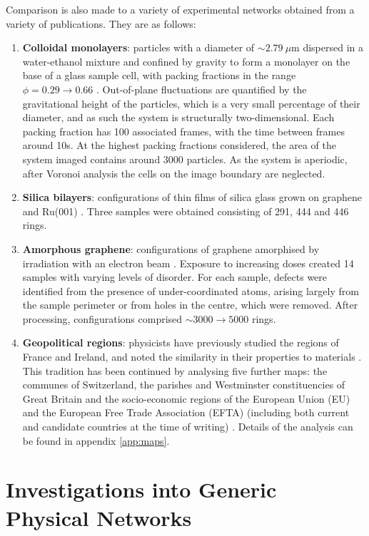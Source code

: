 Comparison is also made to a variety of experimental networks obtained from a variety of publications.
They are as follows:
\begin{enumerate}
	\item \textbf{Colloidal monolayers}: particles with a diameter of $\sim 2.79~\mu$m dispersed in a water\--ethanol mixture and confined by gravity to form a monolayer on the base of a glass sample cell, with packing fractions in the range $\phi=0.29\rightarrow 0.66$ \cite{Thorneywork2017}.
Out\--of\--plane fluctuations are quantified by the gravitational height of the particles, which is a very small percentage of their diameter, and as such the system is structurally two-dimensional.
Each packing fraction has 100 associated frames, with the time between frames around 10s.
At the highest packing fractions considered, the area of the system imaged contains around 3000 particles.
As the system is aperiodic, after Voronoi analysis the cells on the image boundary are neglected.
\item \textbf{Silica bilayers}: configurations of thin films of silica glass grown on graphene \cite{Huang2012} and Ru(001) \cite{Buchner2017}.
Three samples were obtained consisting of 291, 444 and 446 rings.
\item \textbf{Amorphous graphene}: configurations of graphene amorphised by irradiation with an electron beam \cite{Eder2014}.
Exposure to increasing doses created 14 samples with varying levels of disorder.
For each sample, defects were identified from the presence of under\--coordinated atoms, arising largely from the sample perimeter or from holes in the centre, which were removed.
After processing, configurations comprised $\sim3000\rightarrow5000$ rings.
\item \textbf{Geopolitical regions}: physicists have previously studied the regions of France and Ireland, and noted the similarity in their properties to materials \cite{LeCaer1993,Okabe1992}.
This tradition has been continued by analysing five further maps: the communes of Switzerland, the parishes and Westminster constituencies of Great Britain and the socio\--economic regions of the European Union (EU) and the European Free Trade Association (EFTA) (including both current and candidate countries at the time of writing) \cite{osmap,chmap,eumap}. Details of the analysis can be found in appendix \ref{app:maps}.
\end{enumerate}

\section{Investigations into Generic Physical Networks}

